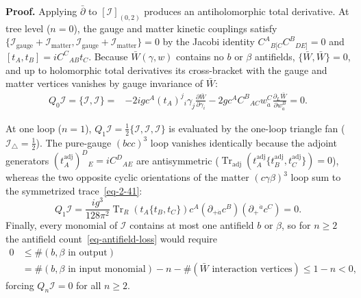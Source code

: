 \documentclass[11pt]{article}
\numberwithin{equation}{section}
\numberwithin{figure}{section}
\numberwithin{table}{section}
\begin{document}
\begin{proofbox}
\textbf{Proof.} Applying $\bar\partial$ to $[\mathcal I]_{(0,2)}$ produces an antiholomorphic total derivative. At tree level ($n=0$), the gauge and matter kinetic couplings satisfy $\{\mathcal I_{\mathrm{gauge}}+\mathcal I_{\mathrm{matter}},\mathcal I_{\mathrm{gauge}}+\mathcal I_{\mathrm{matter}}\}=0$ by the Jacobi identity $C^A{}_{B[C}C^B{}_{DE]}=0$ and $[t_A,t_B]=iC^C{}_{AB}t_C$. Because $\bar W(\gamma,w)$ contains no $b$ or $\beta$ antifields, $\{\bar W,\bar W\}=0$, and up to holomorphic total derivatives its cross-bracket with the gauge and matter vertices vanishes by gauge invariance of $\bar W$:
\begin{equation*}
\begin{aligned}
Q_0\mathcal I=\{\mathcal I,\mathcal I\}
={}&-2igc^A(t_A)^j{}_i\gamma_j
\frac{\partial\bar W}{\partial\gamma_i}
-2gc^AC^B{}_{AC}w^C_{\dot a}
\frac{\partial_L\bar W}{\partial w^B_{\dot a}}=0.
\end{aligned}
\end{equation*}

At one loop ($n=1$), $Q_1\mathcal I=\frac12\{\mathcal I,\mathcal I,\mathcal I\}$ is evaluated by the one-loop triangle fan ($\mathcal I_{\triangle}=\frac12$). The pure-gauge $(bcc)^3$ loop vanishes identically because the adjoint generators $(t_A^{\mathrm{adj}})^D{}_E=iC^D{}_{AE}$ are antisymmetric ($\operatorname{Tr}_{\mathrm{adj}}(t_A^{\mathrm{adj}}\{t_B^{\mathrm{adj}},t_C^{\mathrm{adj}}\})=0$), whereas the two opposite cyclic orientations of the matter $(c\gamma\beta)^3$ loop sum to the symmetrized trace~\eqref{eq-2-41}:
\begin{equation}\label{b-00478}
Q_1\mathcal I
=\frac{ig^3}{128\pi^2}
\operatorname{Tr}_R\!\left(t_A\{t_B,t_C\}\right)
c^A(\partial_{+\dot a}c^B)
(\partial_+{}^{\dot a}c^C)=0.
\end{equation}
Finally, every monomial of $\mathcal I$ contains at most one antifield $b$ or $\beta$, so for $n\ge2$ the antifield count~\eqref{eq-antifield-loss} would require
\begin{equation*}
\begin{aligned}
0&\le\#(b,\beta\text{ in output})\\
&=\#(b,\beta\text{ in input monomial})
-n-\#(\bar W\text{ interaction vertices})
\le 1-n<0,
\end{aligned}
\end{equation*}
forcing $Q_n\mathcal I=0$ for all $n\ge2$.~\hfill\qedsymbol
\end{proofbox}
\end{document}
